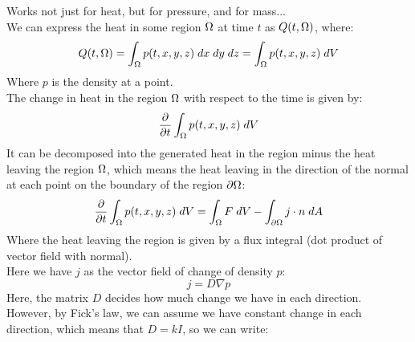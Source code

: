 \documentclass[12pt]{article}
\begin{document}
Works not just for heat, but for pressure, and for
mass... \\

We can express the heat
in some region $\Omega$ at time $t$
as $Q(t, \Omega)$, where:
\[ Q(t, \Omega) = \int_\Omega p(t, x, y, z) 
\; dx \; dy \; dz
= \int_\Omega p(t, x, y, z) \; dV \]
Where $p$ is the density at a point. \\

The change in heat in the region $\Omega$
with respect to the time is given by:
\[ \dfrac{\partial }{\partial t} \int_\Omega p(t, x, y, z) \; dV \]
It can be decomposed into the generated
heat in the region minus the heat
leaving the region $\Omega$,
which means the heat leaving in the direction
of the normal at each point
on the boundary of the region $\partial \Omega$:
\[ \dfrac{\partial }{\partial t} \int_\Omega p(t, x, y, z) \; dV
= \int_\Omega F \; dV
- \int_{\partial \Omega} j \cdot n \; dA \]
Where the heat leaving the region is
given by a flux integral (dot product
of vector field with normal). \\

Here we have $j$ as the vector
field of change of density $p$:
\[ j = D\nabla p \]
Here, the matrix $D$
decides how much change we have in each
direction. \\
However, by Fick's law,
we can assume we have constant change
in each direction, which means that
$D = kI$, so we can write:
\[  \]
\end{document}
